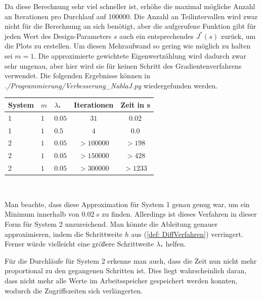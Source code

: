 \documentclass[a4paper,12pt]{report}
\newcommand{\1}{\mathds{1}}
\theoremstyle{plain} %
\theoremstyle{definition} %
\theoremstyle{remark}
\begin{document}
            Da diese Berechnung sehr viel schneller ist, erhöhe die maximal mögliche Anzahl an Iterationen pro Durchlauf auf 100000.
            Die Anzahl an Teilintervallen wird zwar nicht für die Berechnung an sich benötigt, aber die aufgerufene Funktion gibt für jeden Wert des Design-Parameters $s$ auch ein entsprechendes $J^*(s)$ zurück, um die Plots zu erstellen.
            Um diesen Mehraufwand so gering wie möglich zu halten sei $m=1$. Die approximierte gewichtete Eigenwertzählung wird dadurch zwar sehr ungenau, aber hier wird sie für keinen Schritt des Gradientenverfahrens verwendet.
            Die folgenden Ergebnisse können in \textit{./Programmierung/Verbesserung\_NablaJ.py} wiedergefunden werden.

            \begin{table}[!ht]
                  \centering
                  \begin{tabular}{lllcc}
                       System & $m$ & $\lambda_*$ & Iterationen & Zeit in s\\
                       \hline
                       1 & $1$ & $0.05$ & $31$ & $0.02$ \\ 
                       \hline
                       1 & $1$ & $0.5$ & $4$ & $0.0$ \\
                       \hline
                       2 & $1$ & $0.05$ & $>100000$ & $>198$ \\
                       2 & $1$ & $0.05$ & $>150000$ & $>428$ \\
                       2 & $1$ & $0.05$ & $>300000$ & $>1233$ \\
                       \hline
                  \end{tabular}\\
                  \label{tab: Ergebnisse_nablaJ}
            \end{table}

            Man beachte, dass diese Approximation für System 1 genau genug war, um ein Minimum innerhalb von 0.02 s zu finden.
            Allerdings ist dieses Verfahren in dieser Form für System 2 unzureichend. Man könnte die Ableitung genauer approximieren, indem die Schrittweite $h$ aus (\ref{def: DiffVerfahren}) verringert.
            Ferner würde vielleicht eine größere Schrittweite $\lambda_*$ helfen.

            Für die Durchläufe für System 2 erkenne man auch, dass die Zeit nun nicht mehr proportional zu den gegangenen Schritten ist.
            Dies liegt wahrscheinlich daran, dass nicht mehr alle Werte im Arbeitsspeicher gespeichert werden konnten, wodurch die Zugriffszeiten sich verlängerten.
\end{document}
